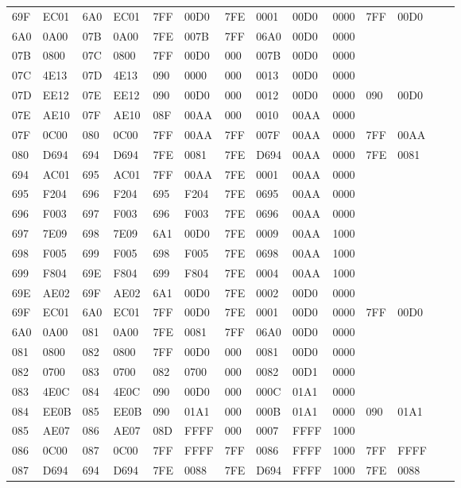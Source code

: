 \begin{tabular}{|*{14}{l|}}
69F & EC01 & 6A0 & EC01 & 7FF & 00D0 & 7FE & 0001 & 00D0 & 0000 & 7FF & 00D0\\
6A0 & 0A00 & 07B & 0A00 & 7FE & 007B & 7FF & 06A0 & 00D0 & 0000 & &\\
07B & 0800 & 07C & 0800 & 7FF & 00D0 & 000 & 007B & 00D0 & 0000 & &\\
07C & 4E13 & 07D & 4E13 & 090 & 0000 & 000 & 0013 & 00D0 & 0000 & &\\
07D & EE12 & 07E & EE12 & 090 & 00D0 & 000 & 0012 & 00D0 & 0000 & 090 & 00D0\\
07E & AE10 & 07F & AE10 & 08F & 00AA & 000 & 0010 & 00AA & 0000 & &\\
07F & 0C00 & 080 & 0C00 & 7FF & 00AA & 7FF & 007F & 00AA & 0000 & 7FF & 00AA\\
080 & D694 & 694 & D694 & 7FE & 0081 & 7FE & D694 & 00AA & 0000 & 7FE & 0081\\
694 & AC01 & 695 & AC01 & 7FF & 00AA & 7FE & 0001 & 00AA & 0000 & &\\
695 & F204 & 696 & F204 & 695 & F204 & 7FE & 0695 & 00AA & 0000 & &\\
696 & F003 & 697 & F003 & 696 & F003 & 7FE & 0696 & 00AA & 0000 & &\\
697 & 7E09 & 698 & 7E09 & 6A1 & 00D0 & 7FE & 0009 & 00AA & 1000 & &\\
698 & F005 & 699 & F005 & 698 & F005 & 7FE & 0698 & 00AA & 1000 & &\\
699 & F804 & 69E & F804 & 699 & F804 & 7FE & 0004 & 00AA & 1000 & &\\
69E & AE02 & 69F & AE02 & 6A1 & 00D0 & 7FE & 0002 & 00D0 & 0000 & &\\
69F & EC01 & 6A0 & EC01 & 7FF & 00D0 & 7FE & 0001 & 00D0 & 0000 & 7FF & 00D0\\
6A0 & 0A00 & 081 & 0A00 & 7FE & 0081 & 7FF & 06A0 & 00D0 & 0000 & &\\
081 & 0800 & 082 & 0800 & 7FF & 00D0 & 000 & 0081 & 00D0 & 0000 & &\\
082 & 0700 & 083 & 0700 & 082 & 0700 & 000 & 0082 & 00D1 & 0000 & &\\
083 & 4E0C & 084 & 4E0C & 090 & 00D0 & 000 & 000C & 01A1 & 0000 & &\\
084 & EE0B & 085 & EE0B & 090 & 01A1 & 000 & 000B & 01A1 & 0000 & 090 & 01A1\\
085 & AE07 & 086 & AE07 & 08D & FFFF & 000 & 0007 & FFFF & 1000 & &\\
086 & 0C00 & 087 & 0C00 & 7FF & FFFF & 7FF & 0086 & FFFF & 1000 & 7FF & FFFF\\
087 & D694 & 694 & D694 & 7FE & 0088 & 7FE & D694 & FFFF & 1000 & 7FE & 0088\\

\end{tabular}
